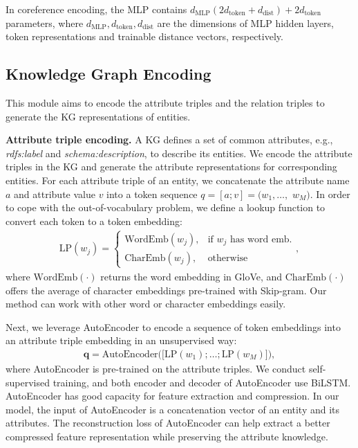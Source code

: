 \documentclass[runningheads]{llncs}
\begin{document}
In coreference encoding, the MLP contains $d_\text{MLP}(2d_\text{token}+d_\text{dist})+2d_\text{token}$ parameters, where $d_\text{MLP},d_\text{token},d_\text{dist}$ are the dimensions of MLP hidden layers, token representations and trainable distance vectors, respectively.

\subsection{Knowledge Graph Encoding}
This module aims to encode the attribute triples and the relation triples to generate the KG representations of entities.

\textbf{Attribute triple encoding.}
A KG defines a set of common attributes, e.g., \textit{rdfs:label} and \textit{schema:description}, to describe its entities.
We encode the attribute triples in the KG and generate the attribute representations for corresponding entities.
For each attribute triple of an entity, we concatenate the attribute name $a$ and attribute value $v$ into a token sequence $q=[a;v]=(w_1,\dots,$ $w_M)$. 
In order to cope with the out-of-vocabulary problem, we define a lookup function to convert each token to a token embedding:
\begin{align}
\mathrm{LP}(w_j) = \left\{
	\begin{array}{ll}
		\mathrm{WordEmb}(w_j), & \text{if } w_j \text{ has word emb.}\\
		\mathrm{CharEmb}(w_j), & \text{otherwise}
	\end{array},
	\right.
\end{align}
where $\mathrm{WordEmb (\cdot)}$ returns the word embedding in GloVe, and $\mathrm{CharEmb (\cdot)}$ offers the average of character embeddings pre-trained with Skip-gram.
Our method can work with other word or character embeddings easily. 

Next, we leverage AutoEncoder to encode a sequence of token embeddings into an attribute triple embedding in an unsupervised way:
\begin{align}
	\mathbf{q} = \textrm{AutoEncoder} \Big(\big[\textrm{LP} (w_1);\dots;\textrm{LP} (w_M)\big]\Big), 
\end{align}
where AutoEncoder is pre-trained on the attribute triples. 
We conduct self-supervised training, and both encoder and decoder of AutoEncoder use BiLSTM. 
AutoEncoder has good capacity for feature extraction and compression. In our model, the input of AutoEncoder is a concatenation vector of an entity and its attributes. The reconstruction loss of AutoEncoder can help extract a better compressed feature representation while preserving the attribute knowledge.
\end{document}
